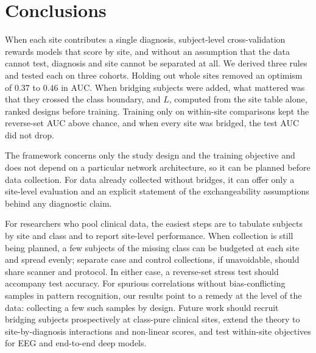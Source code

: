 \section{Conclusions}\label{sec:conclusions}

When each site contributes a single diagnosis, subject-level cross-validation rewards models that score by site, and without an assumption that the data cannot test, diagnosis and site cannot be separated at all. We derived three rules and tested each on three cohorts. Holding out whole sites removed an optimism of $0.37$ to $0.46$ in AUC. When bridging subjects were added, what mattered was that they crossed the class boundary, and $L$, computed from the site table alone, ranked designs before training. Training only on within-site comparisons kept the reverse-set AUC above chance, and when every site was bridged, the test AUC did not drop.

The framework concerns only the study design and the training objective and does not depend on a particular network architecture, so it can be planned before data collection. For data already collected without bridges, it can offer only a site-level evaluation and an explicit statement of the exchangeability assumptions behind any diagnostic claim.

For researchers who pool clinical data, the easiest steps are to tabulate subjects by site and class and to report site-level performance. When collection is still being planned, a few subjects of the missing class can be budgeted at each site and spread evenly; separate case and control collections, if unavoidable, should share scanner and protocol. In either case, a reverse-set stress test should accompany test accuracy. For spurious correlations without bias-conflicting samples in pattern recognition, our results point to a remedy at the level of the data: collecting a few such samples by design. Future work should recruit bridging subjects prospectively at class-pure clinical sites, extend the theory to site-by-diagnosis interactions and non-linear scores, and test within-site objectives for EEG and end-to-end deep models.
